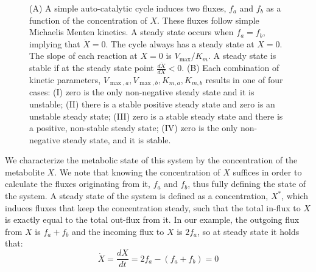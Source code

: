 \documentclass[a4page,notitlepage]{article}
\begin{document}
\begin{figure}[h!]
\begin{minipage}[c]{.65\linewidth}
{}
       \end{minipage}
      \caption{\label{fig:simplecycle}
        (A) A simple auto-catalytic cycle induces two fluxes, $f_a$ and $f_b$ as a function of the concentration of $X$.
        These fluxes follow simple Michaelis Menten kinetics.
        A steady state occurs when $f_a=f_b$, implying that $\dot{X}=0$.
        The cycle always has a steady state at $X=0$.
        The slope of each reaction at $X=0$ is $V_{\max}/K_m$.
        A steady state is stable if at the steady state point $\frac{d\dot{X}}{dX}<0$.
        (B) Each combination of kinetic parameters, $V_{\max,a},V_{\max,b},K_{m,a},K_{m,b}$ results in one of four cases: 
       (I) zero is the only non-negative steady state and it is unstable; 
       (II) there is a stable positive steady state and zero is an unstable steady state; 
       (III) zero is a stable steady state and there is a positive, non-stable steady state; 
       (IV) zero is the only non-negative steady state, and it is stable.}
    \end{figure}

    We characterize the metabolic state of this system by the concentration of the metabolite $X$.
    We note that knowing the concentration of $X$ suffices in order to calculate the fluxes originating from it, $f_a$ and $f_b$, thus fully defining the state of the system.
    A steady state of the system is defined as a concentration, $X^*$, which induces fluxes that keep the concentration steady, such that the total in-flux to $X$ is exactly equal to the total out-flux from it.
    In our example, the outgoing flux from $X$ is $f_a+f_b$ and the incoming flux to $X$ is $2f_a$, so at steady state it holds that:
    \begin{equation*}
      \dot X = \frac{dX}{dt} = 2f_a - (f_a + f_b) = 0
    \end{equation*}
\end{document}
